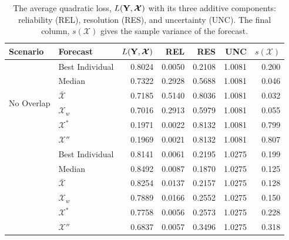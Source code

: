\documentclass[11pt]{article}
\theoremstyle{definition}
\theoremstyle{definition}
\def\Y{{\bf Y}}
\begin{document}
\begin{table}[h!]
\centering
\caption{The average quadratic loss, $L(\Y,\boldsymbol{\mathcal{X}} )$ with its three additive components: reliability (REL), resolution (RES), and uncertainty (UNC). The final column, $s(\boldsymbol{\mathcal{X}} )$ gives the sample variance of the forecast.} 
\begin{tabular}{llrrrrr}
  \hline \hline
Scenario & Forecast & $L(\Y,\boldsymbol{\mathcal{X}} )$ & REL & RES & UNC & $s(\boldsymbol{\mathcal{X}} )$ \\ 
  \hline
 \multirow{6}{*}{No Overlap} & Best Individual & 0.8024 & 0.0050 & 0.2108 & 1.0081 & 0.200\\ 
  & Median & 0.7322 & 0.2928 & 0.5688 & 1.0081& 0.046\\ 
  & $\bar{\mathcal{X}}$ & 0.7185 & 0.5140 & 0.8036 & 1.0081 & 0.032\\ 
  & $\mathcal{X}_w$ & 0.7016 & 0.2913 & 0.5979 & 1.0081 & 0.055\\ 
  & $\mathcal{X}^*$  & 0.1971 & 0.0022 & 0.8132 & 1.0081& 0.799\\ 
  & $\mathcal{X}''$ & 0.1969 & 0.0021 & 0.8132 & 1.0081 & 0.807\\ \rule{0pt}{2.9ex} 
  \multirow{6}{*}{High Overlap} &  Best Individual & 0.8141 & 0.0061 & 0.2195 & 1.0275 &0.199\\ 
  & Median & 0.8492 & 0.0087 & 0.1870 & 1.0275 &0.125 \\ 
  & $\bar{\mathcal{X}}$ & 0.8254 & 0.0137 & 0.2157 & 1.0275 &0.128\\ 
  & $\mathcal{X}_w$ & 0.7889 & 0.0166 & 0.2552 & 1.0275 &0.150 \\ 
  & $\mathcal{X}^*$  & 0.7758 & 0.0056 & 0.2573 & 1.0275 &0.228 \\ 
  &$\mathcal{X}''$ & 0.6837 & 0.0057 & 0.3496 & 1.0275 &0.318 \\ 
   \hline
\end{tabular}
\label{scenA}
\end{table}
\end{document}
